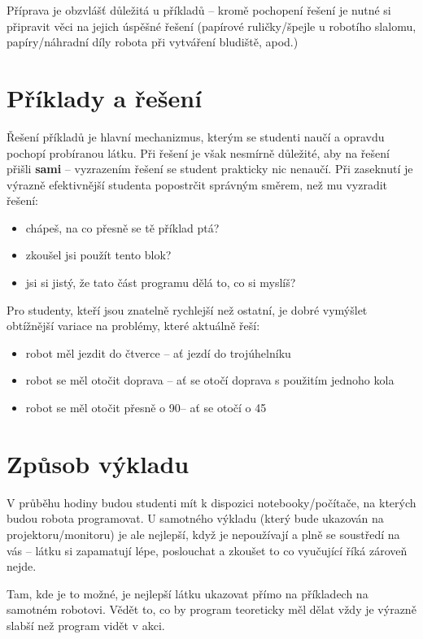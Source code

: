 Příprava je obzvlášť důležitá u příkladů -- kromě pochopení řešení je nutné si připravit věci na jejich úspěšné řešení (papírové ruličky/špejle u robotího slalomu, papíry/náhradní díly robota při vytváření bludiště, apod.)

\section{Příklady a řešení}
Řešení příkladů je hlavní mechanizmus, kterým se studenti naučí a opravdu pochopí probíranou látku. Při řešení je však nesmírně důležité, aby na řešení přišli \textbf{sami} -- vyzrazením řešení se student prakticky nic nenaučí. Při zaseknutí je výrazně efektivnější studenta popostrčit správným směrem, než mu vyzradit řešení:
\begin{itemize}
	\item chápeš, na co přesně se tě příklad ptá?
	\item zkoušel jsi použít tento blok?
	\item jsi si jistý, že tato část programu dělá to, co si myslíš?
\end{itemize}

\vspace{\baselineskip}

Pro studenty, kteří jsou znatelně rychlejší než ostatní, je dobré vymýšlet obtížnější variace na problémy, které aktuálně řeší:
\begin{itemize}
	\item robot měl jezdit do čtverce -- ať jezdí do trojúhelníku
	\item robot se měl otočit doprava -- ať se otočí doprava s použitím jednoho kola
	\item robot se měl otočit přesně o 90\degree -- ať se otočí o 45\degree
\end{itemize}

\section{Způsob výkladu}
V průběhu hodiny budou studenti mít k dispozici notebooky/počítače, na kterých budou robota programovat. U samotného výkladu (který bude ukazován na projektoru/monitoru) je ale nejlepší, když je nepoužívají a plně se soustředí na vás -- látku si zapamatují lépe, poslouchat a zkoušet to co vyučující říká zároveň nejde.

Tam, kde je to možné, je nejlepší látku ukazovat přímo na příkladech na samotném robotovi. Vědět to, co by program teoreticky měl dělat vždy je výrazně slabší než program vidět v akci.

